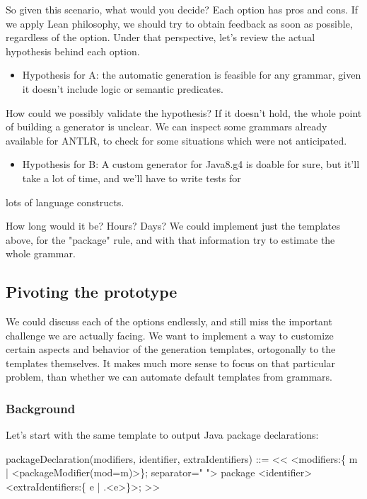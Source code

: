 \documentclass[11pt]{article}
\begin{document}
So given this scenario, what would you decide? Each option has pros and cons. If we apply Lean philosophy, we should try to
obtain feedback as soon as possible, regardless of the option. Under that perspective, let's review the actual hypothesis behind
each option.

\begin{itemize}
\item Hypothesis for A: the automatic generation is feasible for any grammar, given it doesn't include logic or semantic predicates.
\end{itemize}

How could we possibly validate the hypothesis? If it doesn't hold, the whole point of building a generator is unclear. We can inspect
some grammars already available for ANTLR, to check for some situations which were not anticipated.

\begin{itemize}
\item Hypothesis for B: A custom generator for Java8.g4 is doable for sure, but it'll take a lot of time, and we'll have to write tests for
\end{itemize}
lots of language constructs.

How long would it be? Hours? Days? We could implement just the templates above, for the "package" rule, and with that information
try to estimate the whole grammar.

\subsection{Pivoting the prototype}
\label{sec-1-4}

We could discuss each of the options endlessly, and still miss the important challenge we are actually facing. We want to implement
a way to customize certain aspects and behavior of the generation templates, ortogonally to the templates themselves. It makes
much more sense to focus on that particular problem, than whether we can automate default templates from grammars.

\subsubsection{Background}
\label{sec-1-4-1}

Let's start with the same template to output Java package declarations:

packageDeclaration(modifiers, identifier, extraIdentifiers) ::= <<
<modifiers:\{ m | <packageModifier(mod=m)>\}; separator=" "> package <identifier><extraIdentifiers:\{ e | .<e>\}>;
>>
\end{document}

